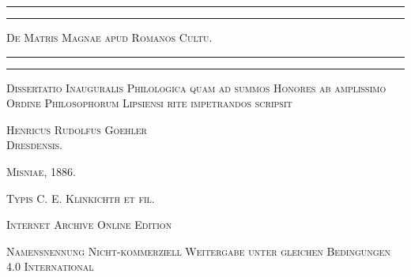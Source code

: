 \documentclass[a4paper, 11pt, oneside, polutonikogreek, german]{article}
\begin{document}
\begin{titlepage} %
	\centering %

	
	\rule{\textwidth}{1.6pt}\vspace*{-\baselineskip}\vspace*{2pt} %
	\rule{\textwidth}{0.4pt} %
	
	\vspace{1\baselineskip} %
	
	{\scshape\Huge De Matris Magnae apud Romanos Cultu.}
	
	\vspace{1\baselineskip} %

	\rule{\textwidth}{0.4pt}\vspace*{-\baselineskip}\vspace{3.2pt} %
	\rule{\textwidth}{1.6pt} %
	
	\vspace{1\baselineskip} %
	
	
	{\scshape Dissertatio Inauguralis Philologica quam ad summos Honores ab amplissimo Ordine Philosophorum Lipsiensi rite impetrandos scripsit} %
	
	\vspace*{1\baselineskip} %
	
        {\scshape \Large Henricus Rudolfus Goehler\\\normalsize Dresdensis.} %

        \vspace*{\fill}

	\vspace{1\baselineskip}

	{\small\scshape Misniae, 1886.}
	
	{\small\scshape{Typis C. E. Klinkichth et fil.}}
	
	\vspace{0.5\baselineskip} %

        \scshape Internet Archive Online Edition%
	
	{\scshape\small Namensnennung Nicht-kommerziell Weitergabe unter gleichen Bedingungen 4.0 International} %
\end{titlepage}
\setlength{\parskip}{1mm plus1mm minus1mm}
\clearpage
\tableofcontents
\clearpage
\end{document}
